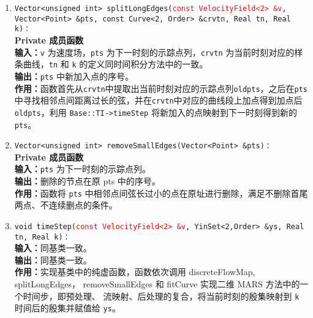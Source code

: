 \documentclass[a4paper,twoside]{ctexart}
\begin{document}
\begin{itemize}
\begin{enumerate}[(1)]
                \item \texttt{Vector<unsigned int> splitLongEdges(}\textcolor{red}{\texttt{const VelocityField<2> \&v}}\texttt{, Vector<Point> \&pts, const Curve<2, Order> \&crvtn, Real tn, Real k)：}\\
                  \textbf{Private 成员函数}\\
                \textbf{输入：}\texttt{v} 为速度场，\texttt{pts} 为下一时刻的示踪点列，\texttt{crvtn} 为当前时刻对应的样条曲线，\texttt{tn} 和 \texttt{k} 的定义同时间积分方法中的一致。\\
                \textbf{输出：}\texttt{pts} 中新加入点的序号。\\
                \textbf{作用：}函数首先从\texttt{crvtn}中提取出当前时刻对应的示踪点列\texttt{oldpts}，之后在\texttt{pts}中寻找相邻点间距离过长的弦，并在\texttt{crvtn}中对应的曲线段上加点得到加点后\texttt{oldpts}，利用 \texttt{Base::TI->timeStep} 将新加入的点映射到下一时刻得到新的\texttt{pts}。
                \item \texttt{Vector<unsigned int> removeSmallEdges(Vector<Point> \&pts)：}\\
                \textbf{Private 成员函数}\\
                \textbf{输入：}\texttt{pts} 为下一时刻的示踪点列。\\
                \textbf{输出：}删除的节点在原 pts 中的序号。\\
                \textbf{作用：}函数将 \texttt{pts} 中相邻点间弦长过小的点在原址进行删除，满足不删除首尾两点、不连续删点的条件。
                \item \texttt{void timeStep(}\textcolor{red}{\texttt{const VelocityField<2> \&v}}\texttt{, YinSet<2,Order> \&ys, Real tn, Real k)：}\\
                \textbf{输入：}同基类一致。\\
                \textbf{输出：}同基类一致。\\
                \textbf{作用：}实现基类中的纯虚函数，函数依次调用
                discreteFlowMap, splitLongEdges， removeSmallEdges 和
                fitCurve 实现二维 MARS 方法中的一个时间步，即预处理、
                流映射、后处理的复合，将当前时刻的殷集映射到
                \texttt{k} 时间后的殷集并赋值给 \texttt{ys}。
            \end{enumerate}
          \end{itemize}




\end{document}
